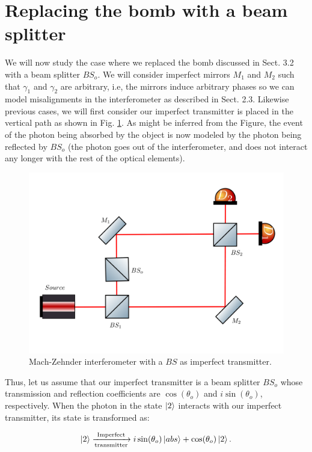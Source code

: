 \documentclass[12pt]{book}
\begin{document}
\section{Replacing the bomb with a beam splitter}

We will now study the case where we replaced the bomb discussed in Sect. 3.2 with a beam splitter $BS_{o}$. We will consider imperfect mirrors $M_{1}$ and $M_{2}$ such that $\gamma_{1}$ and $\gamma_{2}$ are arbitrary, i.e, the mirrors induce arbitrary phases so we can model misalignments in the interferometer as described in Sect. 2.3.  Likewise  previous cases, we will first consider our imperfect transmitter is placed in the vertical path as shown in Fig. \ref{bs vertical}. As might be inferred from the Figure, the event of the photon being absorbed by the object is now modeled by the photon being reflected by $BS_{o}$ (the photon goes out of the interferometer, and does not interact any longer with the rest of the optical elements).



\begin{figure}[t!]
\centering
\includegraphics[width=\linewidth,height=7.5 cm]{images/machzenhderbs.png}
\caption{Mach-Zehnder interferometer with a $BS$ as imperfect transmitter.}
\label{bs vertical}
\end{figure}

Thus, let us assume that our imperfect transmitter is a beam splitter $BS_{o}$ whose transmission and reflection coefficients are $\cos(\theta_{o})$ and $i\sin(\theta_{o})$, respectively. When the photon in the state $\ket{2}$ interacts with our imperfect transmitter, its state is transformed as:

\begin{align}
\ket{2}\xrightarrow[\text{transmitter}]{\text{Imperfect}}i\sin(\theta_{o}) \ket{abs} +\cos(\theta_{o}) \ket{2}.
\end{align}
\end{document}
